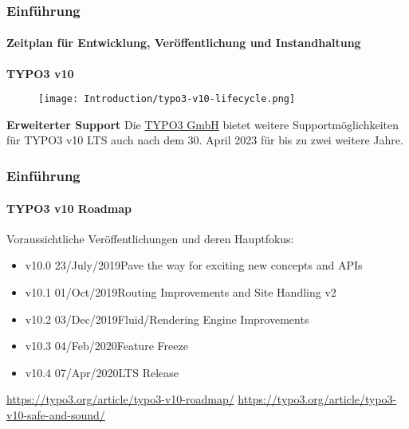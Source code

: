 
\begin{frame}[fragile]
	\frametitle{Einführung}
	\framesubtitle{Zeitplan für Entwicklung, Veröffentlichung und Instandhaltung}

	\textbf{TYPO3 v10}

	\begin{figure}
		\texttt{[image: Introduction/typo3-v10-lifecycle.png]}
	\end{figure}

	\textbf{Erweiterter Support}\newline
	\smaller
		Die \href{https://typo3.com}{TYPO3 GmbH} bietet weitere Supportmöglichkeiten für 
		TYPO3 v10 LTS auch nach dem 30. April 2023 für bis zu zwei weitere
		Jahre.
	\normalsize

\end{frame}


\begin{frame}[fragile]
	\frametitle{Einführung}
	\framesubtitle{TYPO3 v10 Roadmap}

	Voraussichtliche Veröffentlichungen und deren Hauptfokus:

	\begin{itemize}

		\item
			\begingroup
				\color{typo3orange}
				v10.0 \tabto{1.1cm}23/July/2019\tabto{3.4cm}Pave the way for exciting new concepts and APIs
			\endgroup
		\item v10.1 \tabto{1.1cm}01/Oct/2019\tabto{3.4cm}Routing Improvements and Site Handling v2
		\item v10.2 \tabto{1.1cm}03/Dec/2019\tabto{3.4cm}Fluid/Rendering Engine Improvements
		\item v10.3 \tabto{1.1cm}04/Feb/2020\tabto{3.4cm}Feature Freeze
		\item v10.4 \tabto{1.1cm}07/Apr/2020\tabto{3.4cm}LTS Release 

	\end{itemize}

	\smaller
		\url{https://typo3.org/article/typo3-v10-roadmap/}\newline
		\url{https://typo3.org/article/typo3-v10-safe-and-sound/}
	\normalsize

\end{frame}

